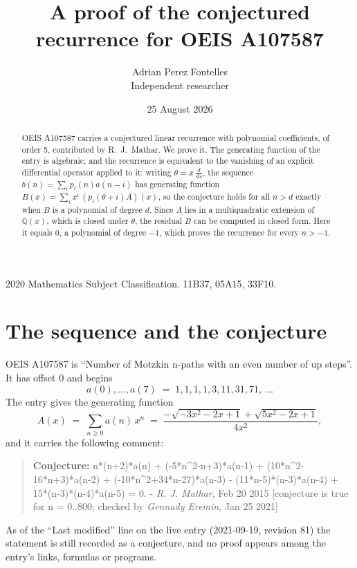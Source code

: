 \documentclass[11pt,a4paper]{article}
\title{A proof of the conjectured recurrence for OEIS A107587}
\author{Adrian Perez Fontelles\\ \small Independent researcher}
\date{25 August 2026}
\theoremstyle{plain}
\theoremstyle{definition}
\begin{document}
\maketitle

\begin{abstract}
OEIS A107587 carries a conjectured linear recurrence with polynomial coefficients, of
order 5, contributed by R.~J.~Mathar. We prove it. The generating function of the
entry is algebraic, and the recurrence is equivalent to the vanishing of an explicit
differential operator applied to it: writing $\theta=x\,\frac{d}{dx}$, the sequence
$b(n)=\sum_{i}p_{i}(n)a(n-i)$ has generating function
$B(x)=\sum_{i}x^{i}\,(p_{i}(\theta+i)A)(x)$, so the conjecture holds for all $n>d$ exactly
when $B$ is a polynomial of degree $d$. Since $A$ lies in a multiquadratic extension of
$\mathbb{Q}(x)$, which is closed under $\theta$, the residual $B$ can be computed in
closed form. Here it equals $0$, a polynomial of degree $-1$, which proves
the recurrence for every $n>-1$.
\end{abstract}

\noindent\small 2020 Mathematics Subject Classification. 11B37, 05A15, 33F10.\normalsize

\section{The sequence and the conjecture}

OEIS A107587 is ``Number of Motzkin n-paths with an even number of up steps''. It has offset $0$ and begins
\[
a(0),\dots,a(7)\;=\;1, 1, 1, 1, 3, 11, 31, 71,\ \dots
\]
The entry gives the generating function
\begin{equation}\label{eq:gf}
A(x)\;=\;\sum_{n\ge 0} a(n)\,x^{n}\;=\;\frac{- \sqrt{- 3 x^{2} - 2 x + 1} + \sqrt{5 x^{2} - 2 x + 1}}{4 x^{2}} ,
\end{equation}
and it carries the following comment:
\begin{quote}\small
\textbf{Conjecture:} n*(n+2)*a(n) + (-5*n\^{}2-n+3)*a(n-1) + (10*n\^{}2-16*n+3)*a(n-2) + (-10*n\^{}2+34*n-27)*a(n-3) - (11*n-5)*(n-3)*a(n-4) + 15*(n-3)*(n-4)*a(n-5) = 0. - \emph{R. J. Mathar}, Feb 20 2015 [conjecture is true for n = 0..800; checked by \emph{Gennady Eremin}, Jan 25 2021]
\end{quote}
As of the ``Last modified'' line on the live entry (2021-09-19, revision 81) the
statement is still recorded as a conjecture, and no proof appears among the entry's links,
formulas or programs.
\end{document}
